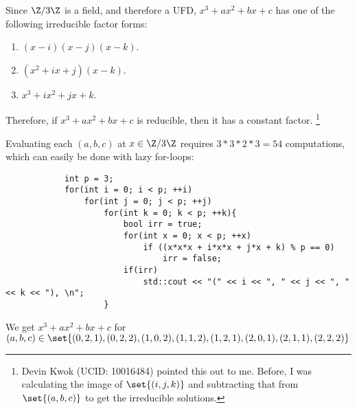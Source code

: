         Since $\Z/3\Z$ is a field, and therefore a UFD,
        $x^3 + ax^2 + bx + c$ has one of the following irreducible factor forms:
        \begin{enumerate}
            \item $(x - i) (x - j) (x - k)$.
            \item $(x^2 + ix + j) (x - k)$.
            \item $x^3 + ix^2 + jx + k$.
        \end{enumerate}

        Therefore, if $x^3 + ax^2 + bx + c$ is reducible, then it has a constant factor.
        \footnote{Devin Kwok (UCID: 10016484) pointed this out to me. Before, 
            I was calculating the image of $\set{(i,j,k)}$ and subtracting that from $\set{(a,b,c)}$ 
            to get the irreducible solutions.}

        Evaluating each $(a,b,c)$ at $x \in \Z/3\Z$ requires $3*3*2*3 = 54$ computations,
        which can easily be done with lazy for-loops:

        \begin{verbatim}
            int p = 3;
            for(int i = 0; i < p; ++i)
                for(int j = 0; j < p; ++j)
                    for(int k = 0; k < p; ++k){
                        bool irr = true;
                        for(int x = 0; x < p; ++x)
                            if ((x*x*x + i*x*x + j*x + k) % p == 0)
                                irr = false;
                        if(irr)	
                            std::cout << "(" << i << ", " << j << ", " << k << "), \n";
                    }
        \end{verbatim}

        We get $x^3 + ax^2 + bx + c$ for
        \(
            (a,b,c) \in
            \set{
                (0, 2, 1), 
                (0, 2, 2),
                (1, 0, 2),
                (1, 1, 2),
                (1, 2, 1),
                (2, 0, 1),
                (2, 1, 1),
                (2, 2, 2)
            }
        \)